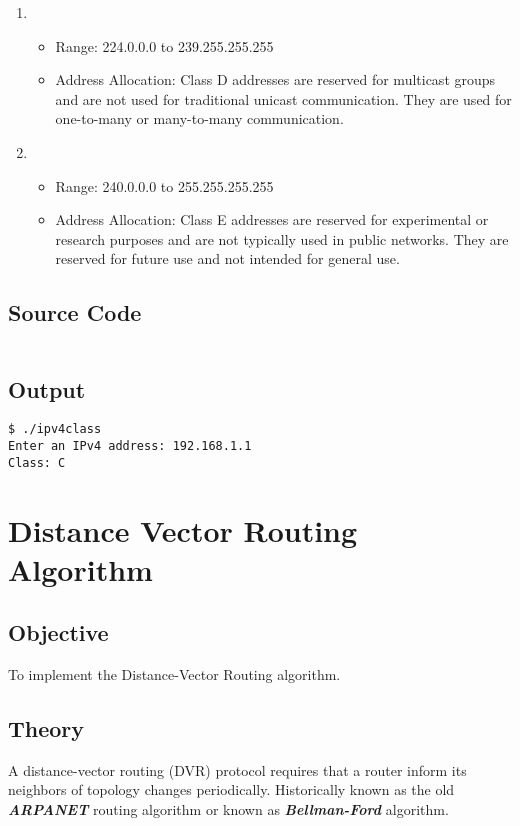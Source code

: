 \documentclass{korigamik}
\begin{document}
\begin{enumerate}[label=\textbf{Class \Alph*:}, leftmargin=2cm]
	\item \begin{itemize}
		      \item Range: 224.0.0.0 to 239.255.255.255
		      \item Address Allocation: Class D addresses are reserved for multicast groups and are not used for traditional unicast communication. They are used for one-to-many or many-to-many communication.
	      \end{itemize}
	      
	\item \begin{itemize}
		      \item Range: 240.0.0.0 to 255.255.255.255
		      \item Address Allocation: Class E addresses are reserved for experimental or research purposes and are not typically used in public networks. They are reserved for future use and not intended for general use.
	      \end{itemize}
\end{enumerate}


\subsection{Source Code}

\inputminted[firstline=5, lastline=25, fontsize=\footnotesize]{cpp}{code/ipv4class.cpp}

\subsection{Output}

\begin{lstlisting}[style=output]
$ ./ipv4class
Enter an IPv4 address: 192.168.1.1
Class: C
\end{lstlisting}

\pagebreak


\section{Distance Vector Routing Algorithm}
\label{sec:Distance Vector Routing Algorithm}

\subsection{Objective}
To implement the Distance-Vector Routing algorithm.

\subsection{Theory}
A distance-vector routing (DVR) protocol requires that a router inform its
neighbors of topology changes periodically. Historically known as the old
\textbf{\textit{ARPANET}} routing algorithm or known as \textbf{\textit{Bellman-Ford}} algorithm.
\end{document}
